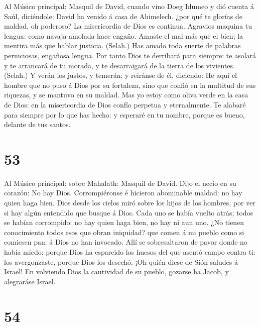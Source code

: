 Al Músico principal: Masquil de David, cuando vino Doeg
Idumeo y dió cuenta á Saúl, diciéndole: David ha venido á casa de
Ahimelech. ¿por qué te glorías de maldad, oh poderoso? La misericordia
de Dios es continua.  Agravios maquina tu lengua: como
navaja amolada hace engaño.  Amaste el mal más que el
bien; la mentira más que hablar justicia. (Selah.)  Has
amado toda suerte de palabras perniciosas, engañosa lengua.
 Por tanto Dios te derribará para siempre: te asolará y te
arrancará de tu morada, y te desarraigará de la tierra de los vivientes.
(Selah.)  Y verán los justos, y temerán; y reiránse de él,
diciendo:  He aquí el hombre que no puso á Dios por su
fortaleza, sino que confió en la multitud de sus riquezas, y se mantuvo
en su maldad.  Mas yo estoy como oliva verde en la casa de
Dios: en la misericordia de Dios confío perpetua y eternalmente.
 Te alabaré para siempre por lo que has hecho: y esperaré
en tu nombre, porque es bueno, delante de tus santos.

\hypertarget{section-52}{%
\section{53}\label{section-52}}

 Al Músico principal: sobre Mahalath: Masquil de David.
Dijo el necio en su corazón: No hay Dios. Corrompiéronse é hicieron
abominable maldad: no hay quien haga bien.  Dios desde los
cielos miró sobre los hijos de los hombres, por ver si hay algún
entendido que busque á Dios.  Cada uno se había vuelto
atrás; todos se habían corrompido: no hay quien haga bien, no hay ni aun
uno.  ¿No tienen conocimiento todos esos que obran
iniquidad? que comen á mi pueblo como si comiesen pan: á Dios no han
invocado.  Allí se sobresaltaron de pavor donde no había
miedo: porque Dios ha esparcido los huesos del que asentó campo contra
ti: los avergonzaste, porque Dios los desechó.  ¡Oh quién
diese de Sión saludes á Israel! En volviendo Dios la cautividad de su
pueblo, gozarse ha Jacob, y alegraráse Israel.

\hypertarget{section-53}{%
\section{54}\label{section-53}}

